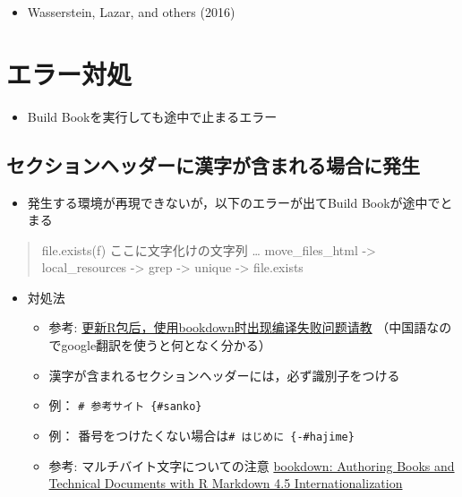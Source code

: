 \documentclass[xelatex,ja=standard]{bxjsbook}
\providecommand{\tightlist}{%
  \setlength{\itemsep}{0pt}\setlength{\parskip}{0pt}}
\begin{document}
\begin{itemize}
\tightlist
\item
  Wasserstein, Lazar, and others (2016)
\end{itemize}

\hypertarget{error}{%
\section{エラー対処}\label{error}}

\begin{itemize}
\tightlist
\item
  Build Bookを実行しても途中で止まるエラー
\end{itemize}

\hypertarget{error_kanji}{%
\subsection{セクションヘッダーに漢字が含まれる場合に発生}\label{error_kanji}}

\begin{itemize}
\tightlist
\item
  発生する環境が再現できないが，以下のエラーが出てBuild Bookが途中でとまる
\end{itemize}

\begin{quote}
file.exists(f) ここに文字化けの文字列 \ldots{} move\_files\_html -\textgreater{} local\_resources -\textgreater{} grep -\textgreater{} unique -\textgreater{} file.exists
\end{quote}

\begin{itemize}
\tightlist
\item
  対処法

  \begin{itemize}
  \tightlist
  \item
    参考: \href{https://d.cosx.org/d/420961-r-bookdown}{更新R包后，使用bookdown时出现编译失败问题请教} （中国語なのでgoogle翻訳を使うと何となく分かる）
  \item
    漢字が含まれるセクションヘッダーには，必ず識別子をつける
  \item
    例： \texttt{\#\ 参考サイト\ \{\#sanko\}}
  \item
    例： 番号をつけたくない場合は\texttt{\#\ はじめに\ \{-\#hajime\}}
  \item
    参考: マルチバイト文字についての注意 \href{https://bookdown.org/yihui/bookdown/internationalization.html}{bookdown: Authoring Books and Technical Documents with R Markdown 4.5 Internationalization}
  \end{itemize}
\end{itemize}
\end{document}
